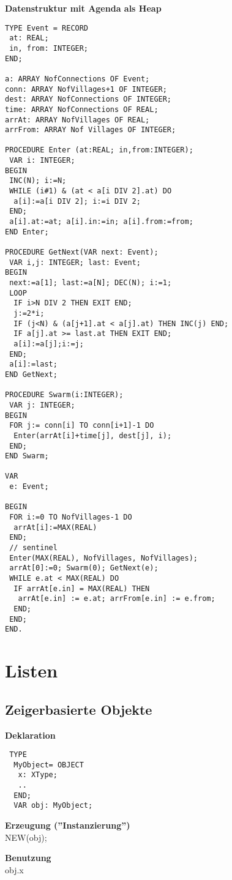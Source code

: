 \documentclass[10pt, a4paper, twocolumn]{scrartcl}
\begin{document}
{\bf Datenstruktur mit Agenda als Heap}
\begin{verbatim}
TYPE Event = RECORD
 at: REAL;
 in, from: INTEGER;
END;

a: ARRAY NofConnections OF Event;
conn: ARRAY NofVillages+1 OF INTEGER;
dest: ARRAY NofConnections OF INTEGER;
time: ARRAY NofConnections OF REAL;
arrAt: ARRAY NofVillages OF REAL;
arrFrom: ARRAY Nof Villages OF INTEGER;

PROCEDURE Enter (at:REAL; in,from:INTEGER);
 VAR i: INTEGER;
BEGIN
 INC(N); i:=N;
 WHILE (i#1) & (at < a[i DIV 2].at) DO
  a[i]:=a[i DIV 2]; i:=i DIV 2; 
 END;
 a[i].at:=at; a[i].in:=in; a[i].from:=from;
END Enter;

PROCEDURE GetNext(VAR next: Event);
 VAR i,j: INTEGER; last: Event;
BEGIN
 next:=a[1]; last:=a[N]; DEC(N); i:=1;
 LOOP
  IF i>N DIV 2 THEN EXIT END;
  j:=2*i;
  IF (j<N) & (a[j+1].at < a[j].at) THEN INC(j) END;
  IF a[j].at >= last.at THEN EXIT END;
  a[i]:=a[j];i:=j;
 END;
 a[i]:=last;
END GetNext;

PROCEDURE Swarm(i:INTEGER);
 VAR j: INTEGER;
BEGIN
 FOR j:= conn[i] TO conn[i+1]-1 DO
  Enter(arrAt[i]+time[j], dest[j], i);
 END;
END Swarm;

VAR
 e: Event;

BEGIN
 FOR i:=0 TO NofVillages-1 DO 
  arrAt[i]:=MAX(REAL)
 END;
 // sentinel
 Enter(MAX(REAL), NofVillages, NofVillages);
 arrAt[0]:=0; Swarm(0); GetNext(e);
 WHILE e.at < MAX(REAL) DO
  IF arrAt[e.in] = MAX(REAL) THEN
   arrAt[e.in] := e.at; arrFrom[e.in] := e.from;
  END;
 END;
END.
\end{verbatim}


\section{Listen}

\subsection{Zeigerbasierte Objekte}
\begin{description}
 \item {\bf Deklaration}
 \begin{verbatim}
 TYPE
  MyObject= OBJECT
   x: XType;
   ..
  END;
  VAR obj: MyObject;
 \end{verbatim}
 \item {\bf Erzeugung (''Instanzierung'')}\\
 NEW(obj);
 \item {\bf Benutzung}\\
 obj.x
\end{description}
\end{document}
